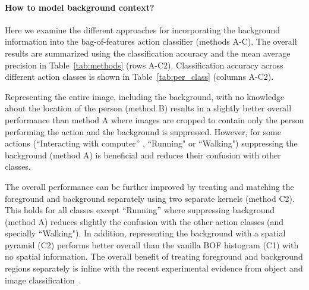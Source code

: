 \documentclass{bmvc2k}
\begin{document}
\paragraph{How to model background context?}
Here we examine the different approaches for incorporating the background information into the bag-of-features action classifier (methods A-C). The overall results are summarized using the classification accuracy and the mean average precision in Table~\ref{tab:methods} (rows A-C2). Classification accuracy across different action classes is shown in Table~\ref{tab:per_class} (columns A-C2).  

Representing the entire image, including the background, with no knowledge about the location of the person (method B) results in a slightly better overall performance than method A where images are cropped to contain only the person performing the action and the background is suppressed.  However, for some actions (``Interacting with computer'' , ``Running" or ``Walking") suppressing the background (method A) is beneficial and reduces their confusion with other classes. %

The overall performance can be further improved  by treating and matching the foreground and
background separately using two separate kernels (method C2). This holds for all classes except ``Running'' where 
suppressing background (method A) reduces slightly the confusion with the other action classes (and specially ``Walking").
In addition, representing the background with a spatial pyramid (C2) performs better overall than
the vanilla BOF histogram (C1) with no spatial information.
  The overall benefit of treating foreground and background regions separately is inline with the recent experimental evidence
  from object and image classification~\cite{Uijlings09,Zhang07}. 
\end{document}
